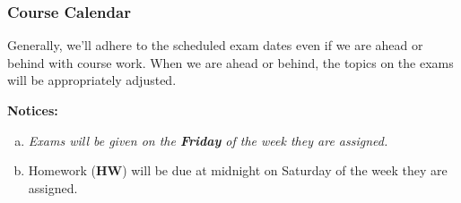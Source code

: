 \documentclass[12pt]{article}
\newcounter{ex}\setcounter{ex}{0}
\newenvironment{alphalist}{
  \begin{enumerate}[(a)]
    \addtolength{\itemsep}{-0.75\itemsep}}
  {\end{enumerate}}
\begin{document}
\subsubsection*{Course Calendar}

Generally, we'll adhere to the scheduled exam dates even if we are ahead or behind with course work.  
When we are ahead or behind, the topics on the exams will be appropriately adjusted.  


\vspace{0.1in}
\noindent \textbf{Notices:}


\begin{alphalist}
   \item \emph{Exams will be given on the \textbf{Friday} of the week they are assigned.}
   

    \item Homework (\textbf{HW}) will be due at midnight on  Saturday of the week they are assigned.  


\end{alphalist}

\vspace{0.1in}
\end{document}
